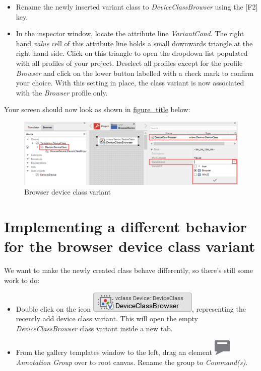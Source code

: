 \documentclass[
  a4paper,
,tablecaptionabove
]{scrbook}
\begin{document}
\begin{itemize}
\item
  Rename the newly inserted variant class to \emph{DeviceClassBrowser}
  using the {[}F2{]} key.
\item
  In the inspector window, locate the attribute line \emph{VariantCond}.
  The right hand \emph{value} cell of this attribute line holds a small
  downwards triangle at the right hand side. Click on this triangle to
  open the dropdown list populated with all profiles of your project.
  Deselect all profiles except for the profile \emph{Browser} and click
  on the lower button labelled with a check mark to confirm your choice.
  With this setting in place, the class variant is now associated with
  the \emph{Browser} profile only.
\end{itemize}

Your screen should now look as shown in
\protect\hyperlink{fig:ClassVariant}{figure\_title} below:

\begin{figure}
\centering
\includegraphics{./../asciidoc/modules/ROOT/assets/images/deviceintegration/DeviceClassBrowser.png}
\caption{Browser device class variant}
\end{figure}

\hypertarget{_implementing_a_different_behavior_for_the_browser_device_class_variant}{%
\section{Implementing a different behavior for the browser device class
variant}\label{_implementing_a_different_behavior_for_the_browser_device_class_variant}}

We want to make the newly created class behave differently, so there's
still some work to do:

\begin{itemize}
\item
  Double click on the icon
  \includegraphics{./../asciidoc/modules/ROOT/assets/images/icons/DeviceClassBrowserIcon.png},
  representing the recently add device class variant. This will open the
  empty \emph{DeviceClassBrowser} class variant inside a new tab.
\item
  From the gallery templates window to the left, drag an element
  \includegraphics{./../asciidoc/modules/ROOT/assets/images/icons/AnnotationGroupIcon.png}
  \emph{Annotation Group} over to root canvas. Rename the group to
  \emph{Command(s)}.
\end{itemize}
\end{document}
